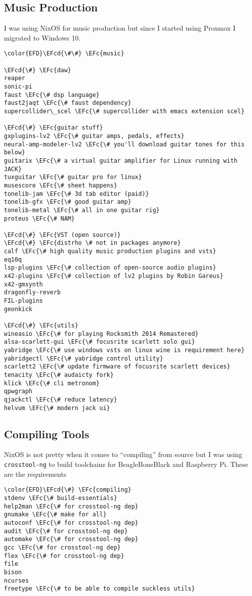 \documentclass[14pt]{article}
\newcommand{\EFc}[1]{\textcolor{EFc}{#1}} %
\newcommand{\EFcd}[1]{\textcolor{EFcd}{#1}} %
\begin{document}
\subsection{Music Production}
\label{sec:orgbb5b8c1}
I was using NixOS for music production but since I started using Proxmox I migrated to Windows 10.
\begin{Code}
\begin{Verbatim}
\color{EFD}\EFcd{\#\#} \EFc{music}

\EFcd{\#} \EFc{daw}
reaper
sonic-pi
faust \EFc{\# dsp language}
faust2jaqt \EFc{\# faust dependency}
supercollider\_scel \EFc{\# supercollider with emacs extension scel}

\EFcd{\#} \EFc{guitar stuff}
gxplugins-lv2 \EFc{\# guitar amps, pedals, effects}
neural-amp-modeler-lv2 \EFc{\# you'll download guitar tones for this below}
guitarix \EFc{\# a virtual guitar amplifier for Linux running with JACK}
tuxguitar \EFc{\# guitar pro for linux}
musescore \EFc{\# sheet happens}
tonelib-jam \EFc{\# 3d tab editor (paid)}
tonelib-gfx \EFc{\# good guitar amp}
tonelib-metal \EFc{\# all in one guitar rig}
proteus \EFc{\# NAM}

\EFcd{\#} \EFc{VST (open source)}
\EFcd{\#} \EFc{distrho \# not in packages anymore}
calf \EFc{\# high quality music production plugins and vsts}
eq10q
lsp-plugins \EFc{\# collection of open-source audio plugins}
x42-plugins \EFc{\# collection of lv2 plugins by Robin Gareus}
x42-gmsynth
dragonfly-reverb
FIL-plugins
geonkick

\EFcd{\#} \EFc{utils}
wineasio \EFc{\# for playing Rocksmith 2014 Remastered}
alsa-scarlett-gui \EFc{\# focusrite scarlett solo gui}
yabridge \EFc{\# use windows vsts on linux wine is requirement here}
yabridgectl \EFc{\# yabridge control utility}
scarlett2 \EFc{\# update firmware of focusrite scarlett devices}
tenacity \EFc{\# audaicty fork}
klick \EFc{\# cli metronom}
qpwgraph
qjackctl \EFc{\# reduce latency}
helvum \EFc{\# modern jack ui}
\end{Verbatim}
\end{Code}
\subsection{Compiling Tools}
\label{sec:org528f2c4}
NixOS is not pretty when it comes to ``compiling'' from source but I was using \texttt{crosstool-ng} to build toolchains for BeagleBoneBlack and Raspberry Pi. These are the requirements
\begin{Code}
\begin{Verbatim}
\color{EFD}\EFcd{\#} \EFc{compiling}
stdenv \EFc{\# build-essentials}
help2man \EFc{\# for crosstool-ng dep}
gnumake \EFc{\# make for all}
autoconf \EFc{\# for crosstool-ng dep}
audit \EFc{\# for crosstool-ng dep}
automake \EFc{\# for crosstool-ng dep}
gcc \EFc{\# for crosstool-ng dep}
flex \EFc{\# for crosstool-ng dep}
file
bison
ncurses
freetype \EFc{\# to be able to compile suckless utils}
\end{Verbatim}
\end{Code}
\end{document}

